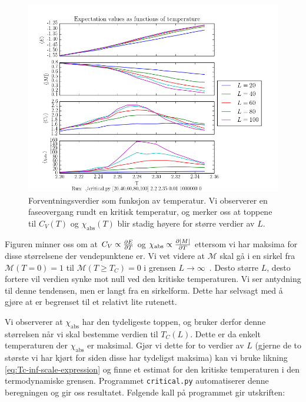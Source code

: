 \documentclass[11pt]{article}
\newcommand{\abs}[1]{|#1|}
\begin{document}
\begin{figure}[ht]
  \centering
  \includegraphics[scale=0.7]{../fig/critical.png}
  \caption{\label{fig:critical-plot} Forventningsverdier som funksjon
    av temperatur. Vi observerer en faseovergang rundt en kritisk
    temperatur, og merker oss at toppene til $C_V(T)$ og
    $\chi_\text{abs}(T)$ blir stadig høyere for større verdier av $L$.}
\end{figure}
Figuren minner oss om at $C_V \propto \frac{\partial E}{\partial T}$ og $\chi_\text{abs}
\propto \pd{\abs{M}}{T}$ ettersom vi har maksima for disse størrelsene
der vendepunktene er. Vi vet videre at $\mathcal{M}$ skal gå i
en sirkel fra $\mathcal{M}(T=0)=1$ til $\mathcal{M}(T\geq T_C)=0$ i
grensen $L\rightarrow\infty$~\cite{ising-model-texas-uni}. Desto
større $L$, desto fortere vil verdien synke mot null ved den kritiske
temperaturen. Vi ser antydning til denne tendensen, men er langt fra
en sirkelform. Dette har selvsagt med å gjøre at er begrenset til et
relativt lite rutenett. 

Vi observerer at $\chi_\text{abs}$ har den tydeligeste toppen, og
bruker derfor denne størrelsen når vi skal bestemme verdien til
$T_C(L)$. Dette er da enkelt temperaturen der $\chi_\text{abs}$ er
maksimal. Gjør vi dette for to verdier av $L$ (gjerne de to største vi
har kjørt for siden disse har tydeligst maksima) kan vi bruke likning
\eqref{eq:Tc-inf-scale-expression} og finne et estimat for den
kritiske temperaturen i den termodynamiske grensen. Programmet
\texttt{critical.py} automatiserer denne beregningen og gir oss
resultatet. Følgende kall på programmet gir utskriften:

\clearpage
\printbibliography
\end{document}
